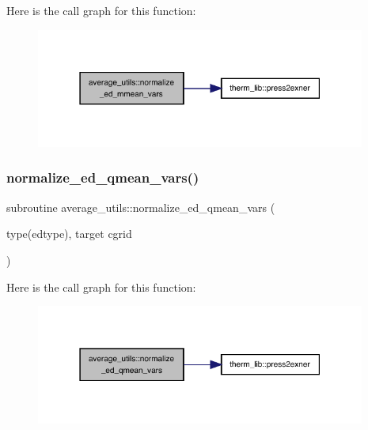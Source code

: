 Here is the call graph for this function\+:
\nopagebreak
\begin{figure}[H]
\begin{center}
\leavevmode
\includegraphics[width=307pt]{namespaceaverage__utils_afce18c59b2e9d5605d22e4d356934bdb_cgraph}
\end{center}
\end{figure}
\mbox{\label{namespaceaverage__utils_ad7f232f9a24079c3430b005098729615}} 
\subsubsection{\texorpdfstring{normalize\+\_\+ed\+\_\+qmean\+\_\+vars()}{normalize\_ed\_qmean\_vars()}}
{\footnotesize\ttfamily subroutine average\+\_\+utils\+::normalize\+\_\+ed\+\_\+qmean\+\_\+vars (\begin{DoxyParamCaption}\item[{type(edtype), target}]{cgrid }\end{DoxyParamCaption})}

Here is the call graph for this function\+:
\nopagebreak
\begin{figure}[H]
\begin{center}
\leavevmode
\includegraphics[width=307pt]{namespaceaverage__utils_ad7f232f9a24079c3430b005098729615_cgraph}
\end{center}
\end{figure}
\mbox{\label{namespaceaverage__utils_a538e2e59c7c2889ae624b6e1d2a9e5f2}} 
